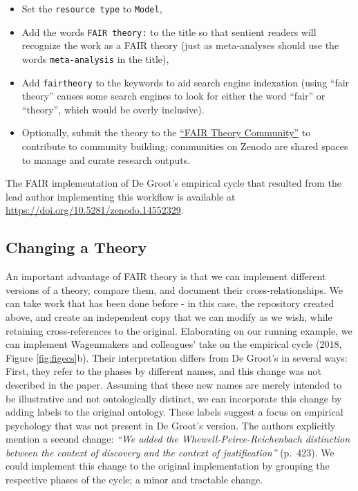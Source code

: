 \documentclass[man]{apa7}
\providecommand{\tightlist}{%
  \setlength{\itemsep}{0pt}\setlength{\parskip}{0pt}}
\begin{document}
\begin{itemize}
\tightlist
\item
  Set the \texttt{resource\ type} to \texttt{Model},
\item
  Add the words \texttt{FAIR\ theory:} to the title so that sentient readers will recognize the work as a FAIR theory (just as meta-analyses should use the words \texttt{meta-analysis} in the title),
\item
  Add \texttt{fairtheory} to the keywords to aid search engine indexation (using ``fair theory'' causes some search engines to look for either the word ``fair'' or ``theory'', which would be overly inclusive).
\item
  Optionally, submit the theory to the \href{https://zenodo.org/communities/fairtheory}{``FAIR Theory Community''} to contribute to community building; communities on Zenodo are shared spaces to manage and curate research outputs.
\end{itemize}

The FAIR implementation of De Groot's empirical cycle that resulted from the lead author implementing this workflow is available at \url{https://doi.org/10.5281/zenodo.14552329}.

\subsection{Changing a Theory}\label{changing-a-theory}

An important advantage of FAIR theory is that we can implement different versions of a theory, compare them, and document their cross-relationships.
We can take work that has been done before - in this case, the repository created above, and create an independent copy that we can modify as we wish, while retaining cross-references to the original.
Elaborating on our running example, we can implement Wagenmakers and colleagues' take on the empirical cycle (2018, Figure \ref{fig:figecs}b).
Their interpretation differs from De Groot's in several ways:
First, they refer to the phases by different names, and this change was not described in the paper.
Assuming that these new names are merely intended to be illustrative and not ontologically distinct,
we can incorporate this change by adding labels to the original ontology.
These labels suggest a focus on empirical psychology that was not present in De Groot's version.
The authors explicitly mention a second change: \emph{``We added the Whewell-Peirce-Reichenbach distinction between the context of discovery and the context of justification''} (p.~423).
We could implement this change to the original implementation by grouping the respective phases of the cycle;
a minor and tractable change.
\end{document}
